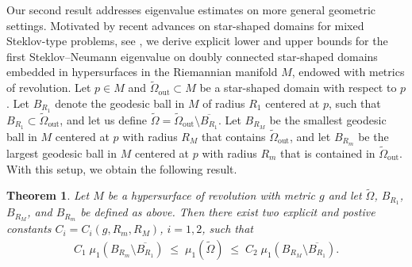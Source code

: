 \documentclass[12pt,reqno]{amsart}
\newtheorem{theorem}{Theorem}[section]
\numberwithin{equation}{section}
\numberwithin{theorem}{section}
\numberwithin{equation}{section}
\numberwithin{theorem}{section}
\begin{document}
Our second result addresses eigenvalue estimates on more general geometric
settings. Motivated by recent advances on star-shaped domains for mixed
Steklov-type problems, see \cite{basak2024bounds}, we derive explicit lower and upper bounds for the
first Steklov--Neumann eigenvalue on doubly connected star-shaped domains
embedded in hypersurfaces in the Riemannian manifold $M$, endowed with metrics of revolution. 
Let $p\in M$ and  $\tilde{\Omega}_{\mathrm{out}} \subset M$ be a star-shaped domain with respect to $p$. Let 
$B_{R_1}$ denote the geodesic ball in $M$ of radius $R_1$ centered at $p$, such that $B_{R_1} \subset \tilde{\Omega}_{\mathrm{out}}$, and let us
define $\tilde{\Omega} = \tilde{\Omega}_{\mathrm{out}} \setminus \overline{B_{R_1}}.$
Let $B_{R_M}$ be the smallest geodesic ball in $M$ centered at $p$ with radius $R_M$ that contains 
$\tilde{\Omega}_{\mathrm{out}}$, and let $B_{R_m}$ be the largest geodesic ball in $M$ centered at $p$ with radius 
$R_m$ that is contained in $\tilde{\Omega}_{\mathrm{out}}$. With this setup, we obtain the following result.



\begin{theorem}\label{thm:upper-lower}
Let $M$ be a hypersurface of revolution  with  metric $g$ and let $\tilde{\Omega}$, $B_{R_1}$, $B_{R_M}$, and $B_{R_m}$ be defined as above. Then there exist two explicit and postive constants $C_i=C_i(g,R_m,R_M)$, $i=1,2$, such that 
\begin{align*}
C_1\;
\mu_1\!\left(B_{R_m}\setminus \overline{B_{R_1}}\right)
\;\le\; \mu_1(\tilde{\Omega}) 
\;\le\;
C_2\;
\mu_1\!\left(B_{R_M}\setminus \overline{B_{R_1}}\right).
\end{align*}
\end{theorem}


\end{document}
